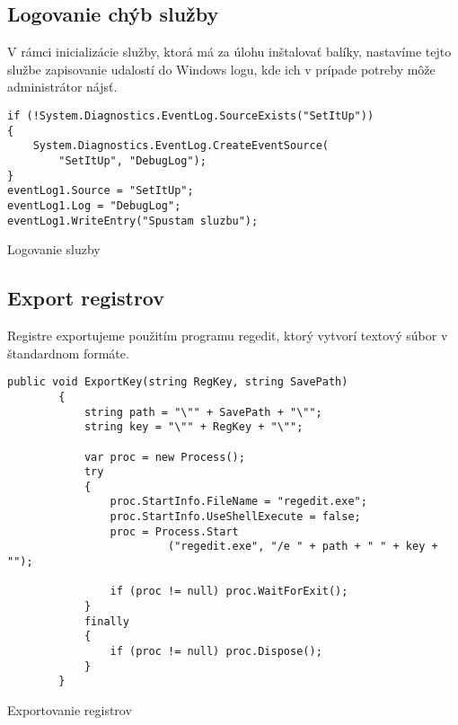 \subsection{Logovanie chýb služby}
V rámci inicializácie služby, ktorá má za úlohu inštalovať balíky, nastavíme tejto službe zapisovanie udalostí do Windows logu, kde ich v prípade potreby môže administrátor nájsť.
\begin{listing}
\begin{verbatim}
if (!System.Diagnostics.EventLog.SourceExists("SetItUp"))
{
    System.Diagnostics.EventLog.CreateEventSource(
        "SetItUp", "DebugLog");
}
eventLog1.Source = "SetItUp";
eventLog1.Log = "DebugLog";
eventLog1.WriteEntry("Spustam sluzbu");
\end{verbatim}
\caption{Logovanie sluzby}
\label{lst:initlog}
\end{listing}

\subsection{Export registrov}
Registre exportujeme použitím programu regedit, ktorý vytvorí textový súbor v štandardnom formáte.
\begin{listing}
\begin{verbatim}
public void ExportKey(string RegKey, string SavePath)
        {
            string path = "\"" + SavePath + "\"";
            string key = "\"" + RegKey + "\"";

            var proc = new Process();
            try
            {
                proc.StartInfo.FileName = "regedit.exe";
                proc.StartInfo.UseShellExecute = false;
                proc = Process.Start
                         ("regedit.exe", "/e " + path + " " + key + "");

                if (proc != null) proc.WaitForExit();
            }
            finally
            {
                if (proc != null) proc.Dispose();
            }
        }  
\end{verbatim}
\caption{Exportovanie registrov}
\label{lst:regexport}
\end{listing}

